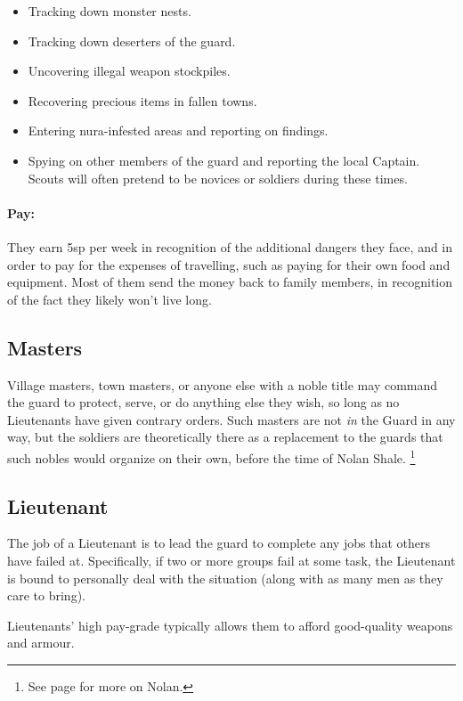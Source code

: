 \begin{multicols}{2}
\begin{itemize}
  \item
  Tracking down monster nests.
  \item
  Tracking down deserters of the \gls{guard}.
  \item
  Uncovering illegal weapon stockpiles.
  \item
  Recovering precious items in fallen towns.
  \item
  Entering nura-infested areas and reporting on findings.
  \item
  Spying on other members of the \gls{guard} and reporting the local Captain.
  Scouts will often pretend to be novices or soldiers during these times.
\end{itemize}


\paragraph{Pay:}
They earn 5sp per week in recognition of the additional dangers they face, and in order to pay for the expenses of travelling, such as paying for their own food and equipment.
Most of them send the money back to family members, in recognition of the fact they likely won't live long.

\subsection{Masters}

Village masters, town masters, or anyone else with a noble title may command the \gls{guard} to protect, serve, or do anything else they wish, so long as no Lieutenants have given contrary orders.
Such masters are not \textit{in} the Guard in any way, but the soldiers are theoretically there as a replacement to the guards that such nobles would organize on their own, before the time of Nolan Shale.%
\footnote{See page \pageref{nolan} for more on Nolan.}

\subsection{Lieutenant}

The job of a Lieutenant is to lead the \gls{guard} to complete any jobs that others have failed at.
Specifically, if two or more groups fail at some task, the Lieutenant is bound to personally deal with the situation (along with as many men as they care to bring).

Lieutenants' high pay-grade typically allows them to afford good-quality weapons and armour.


\end{multicols}
